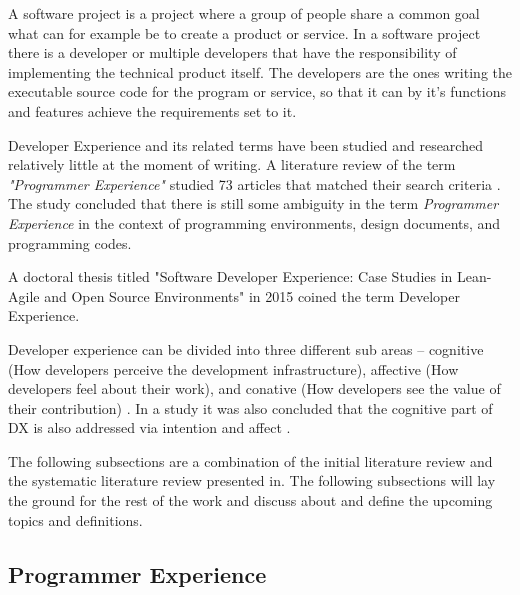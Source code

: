 \documentclass[english, 12pt, a4paper, sci, utf8, a-1b, online]{aaltothesis}
\begin{document}


A software project is a project where a group of people share a common goal what can for example be to create a product or service. In a software project there is a developer or multiple developers that have the responsibility of implementing the technical product itself. The developers are the ones writing the executable source code for the program or service, so that it can by it's functions and features achieve the requirements set to it.

Developer Experience and its related terms have been studied and researched relatively little at the moment of writing. A literature review of the term \textit{"Programmer Experience"} studied 73 articles that matched their search criteria \citep{programmer-experience}. The study concluded that there is still some ambiguity in the term \textit{Programmer Experience} in the context of programming environments, design documents, and programming codes.

A doctoral thesis titled "Software Developer Experience:
Case Studies in Lean-Agile and Open Source Environments" in 2015 coined the term Developer Experience.

Developer experience can be divided into three different sub areas – cognitive (How developers perceive the development infrastructure), affective (How developers feel about their work), and conative (How developers see the value of their contribution) \citep{fagerholm-dx-concept-and-definition}. In a study it was also concluded that the cognitive part of DX is also addressed via intention and affect \citep{kuusinen-flow}.

The following subsections are a combination of the initial literature review and the systematic literature review presented in. The following subsections will lay the ground for the rest of the work and discuss about and define the upcoming topics and definitions.

\subsection{Programmer Experience}

\end{document}

